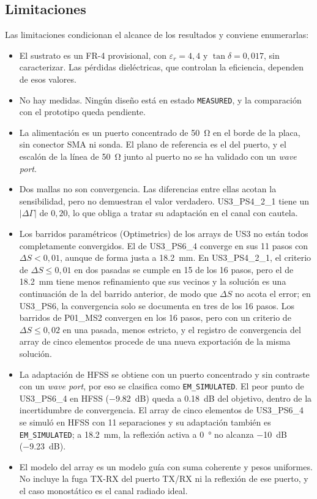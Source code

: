\documentclass[11pt,a4paper]{article}
\begin{document}
\subsection{Limitaciones}
Las limitaciones condicionan el alcance de los resultados y conviene enumerarlas:
\begin{itemize}
    \item El sustrato es un FR-4 provisional, con $\varepsilon_r = 4{,}4$ y $\tan\delta = 0{,}017$, sin
    caracterizar. Las pérdidas dieléctricas, que controlan la eficiencia, dependen de esos valores.
    \item No hay medidas. Ningún diseño está en estado \texttt{MEASURED}, y la comparación con el
    prototipo queda pendiente.
    \item La alimentación es un puerto concentrado de \SI{50}{\ohm} en el borde de la placa, sin
    conector SMA ni sonda. El plano de referencia es el del puerto, y el escalón de la línea de
    \SI{50}{\ohm} junto al puerto no se ha validado con un \textit{wave port}.
    \item Dos mallas no son convergencia. Las diferencias entre ellas acotan la sensibilidad, pero no
    demuestran el valor verdadero. US3\_PS4\_2\_1 tiene un $|\Delta\Gamma|$ de $0{,}20$, lo que obliga a
    tratar su adaptación en el canal con cautela.
    \item Los barridos paramétricos (Optimetrics) de los arrays de US3 no están todos completamente convergidos. El de US3\_PS6\_4 converge en sus 11 pasos con $\Delta S < 0{,}01$, aunque de forma justa a \SI{18.2}{mm}. En US3\_PS4\_2\_1, el criterio de $\Delta S \le 0{,}01$ en dos pasadas se cumple en 15 de los 16 pasos, pero el de \SI{18.2}{mm} tiene menos refinamiento que sus vecinos y la solución es una continuación de la del barrido anterior, de modo que $\Delta S$ no acota el error; en US3\_PS6, la convergencia solo se documenta en tres de los 16 pasos. Los barridos de P01\_MS2 convergen en los 16 pasos, pero con un criterio de $\Delta S \le 0{,}02$ en una pasada, menos estricto, y el registro de convergencia del array de cinco elementos procede de una nueva exportación de la misma solución.
    \item La adaptación de HFSS se obtiene con un puerto concentrado y sin contraste con un \textit{wave port}, por eso se clasifica como \texttt{EM\_SIMULATED}. El peor punto de US3\_PS6\_4 en HFSS (\SI{-9.82}{dB}) queda a \SI{0.18}{dB} del objetivo, dentro de la incertidumbre de convergencia. El array de cinco elementos de US3\_PS6\_4 se simuló en HFSS con 11 separaciones y su adaptación también es \texttt{EM\_SIMULATED}; a \SI{18.2}{mm}, la reflexión activa a \SI{0}{\degree} no alcanza \SI{-10}{dB} (\SI{-9.23}{dB}).
    \item El modelo del array es un modelo guía con suma coherente y pesos uniformes. No incluye la
    fuga TX-RX del puerto TX/RX ni la reflexión de ese puerto, y el caso monostático es el canal radiado ideal.
\end{itemize}
\end{document}
